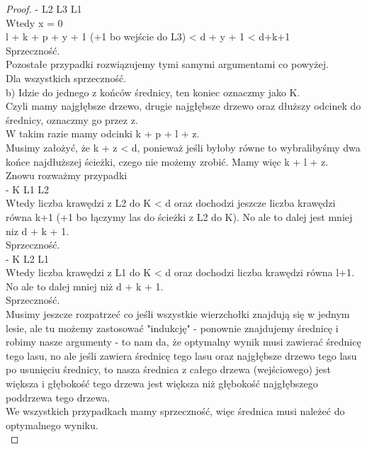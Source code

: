 \documentclass{article}
\theoremstyle{plain}
\begin{document}
\begin{proof}
- L2 L3 L1 \\
Wtedy x = 0\\
l + k + p + y + 1 (+1 bo wejście do L3) < d + y + 1 < d+k+1\\
Sprzeczność.\\

Pozostałe przypadki rozwiązujemy tymi samymi argumentami co powyżej.\\
Dla wszystkich sprzeczność.\\

b) Idzie do jednego z końców średnicy, ten koniec oznaczmy jako K. \\
Czyli mamy najgłębsze drzewo, drugie najgłębsze drzewo oraz dłuższy odcinek do średnicy, oznaczmy go przez z. \\
W takim razie mamy odcinki k + p + l + z.\\
Musimy założyć, że k + z < d, ponieważ jeśli byłoby równe to wybralibyśmy dwa końce najdłuższej ścieżki, czego nie możemy zrobić. Mamy więc k + l + z.\\

Znowu rozważmy przypadki \\
- K L1 L2 \\
Wtedy liczba krawędzi z L2 do K < d oraz dochodzi jeszcze liczba krawędzi równa k+1 (+1 bo łączymy las do ścieżki z L2 do K). No ale to dalej jest mniej niz d + k + 1.\\
Sprzeczność.\\

- K L2 L1 \\
Wtedy liczba krawędzi z L1 do K < d oraz dochodzi liczba krawędzi równa l+1. No ale to dalej mniej niż d + k + 1.\\
Sprzeczność.\\


Musimy jeszcze rozpatrzeć co jeśli wszystkie wierzchołki znajdują się w jednym lesie, ale tu możemy zastosować "indukcję" - ponownie znajdujemy średnicę i robimy nasze argumenty - to nam da, że optymalny wynik musi zawierać średnicę tego lasu, no ale jeśli zawiera średnicę tego lasu oraz najgłębsze drzewo tego lasu po usunięciu średnicy, to nasza średnica z całego drzewa (wejściowego) jest większa i głębokość tego drzewa jest większa niż głębokość najgłębszego poddrzewa tego drzewa.\\

We wszystkich przypadkach mamy sprzeczność, więc średnica musi należeć do optymalnego wyniku.\\
\end{proof}
\end{document}
